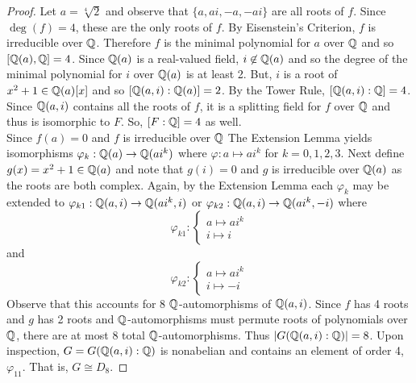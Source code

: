 \documentclass[../AlgebraQualSolutions.tex]{subfiles}
\begin{document}
\begin{proof}
    Let $a = \sqrt[4]{2}$ and  observe that $\{a,ai,-a,-ai\}$ are all roots of $f$. Since $\deg(f) = 4$, these are the only roots of $f$. By Eisenstein's Criterion, $f$ is irreducible over $\mathbb{Q}$. Therefore $f$ is the minimal polynomial for $a$ over $\mathbb{Q}$ and so $[\mathbb{Q}(a),\mathbb{Q}] = 4$. Since $\mathbb{Q}(a)$ is a real-valued field, $i \not\in \mathbb{Q}(a)$ and so the degree of the minimal polynomial for $i$ over $\mathbb{Q}(a)$ is at least 2. But, $i$ is a root of $x^2 + 1 \in \mathbb{Q}(a)[x]$ and so $[\mathbb{Q}(a,i): \mathbb{Q}(a)] = 2$. By the Tower Rule, $[\mathbb{Q}(a,i): \mathbb{Q}] = 4$. Since $\mathbb{Q}(a,i)$ contains all the roots of $f$, it is a splitting field for $f$ over $\mathbb{Q}$ and thus is isomorphic to $F$. So, $[F: \mathbb{Q}] = 4$ as well.\\

    Since $f(a) = 0$ and $f$ is irreducible over $\mathbb{Q}$ The Extension Lemma yields isomorphisms $\varphi_k: \mathbb{Q}(a) \to \mathbb{Q}(ai^k)$ where $\varphi:a \mapsto ai^k$ for $k = 0,1,2,3$. Next define $g(x) = x^2 + 1 \in \mathbb{Q}(a)$ and note that $g(i) = 0$ and $g$ is irreducible over $\mathbb{Q}(a)$ as the roots are both complex. Again, by the Extension Lemma each $\varphi_k$ may be extended to $\varphi_{k1}: \mathbb{Q}(a,i) \to \mathbb{Q}(ai^k, i)$ or $\varphi_{k2}: \mathbb{Q}(a,i) \to \mathbb{Q}(ai^k,-i)$ where
        \[\varphi_{k1}: \begin{cases}
            a \mapsto ai^k\\
            i \mapsto i
        \end{cases}\]
    and
        \[\varphi_{k2}: \begin{cases}
        a \mapsto ai^k\\
        i \mapsto -i
    \end{cases}\]
    Observe that this accounts for 8 $\mathbb{Q}$-automorphisms of $\mathbb{Q}(a,i)$. Since $f$ has 4 roots and $g$ has 2 roots and $\mathbb{Q}$-automorphisms must permute roots of polynomials over $\mathbb{Q}$, there are at most 8 total $\mathbb{Q}$-automorphisms. Thus $|G(\mathbb{Q}(a,i): \mathbb{Q})| = 8$. Upon inspection, $G = G(\mathbb{Q}(a,i): \mathbb{Q})$ is nonabelian and contains an element of order 4, $\varphi_{11}$. That is, $G \cong D_8$. 
\end{proof}
\end{document}
